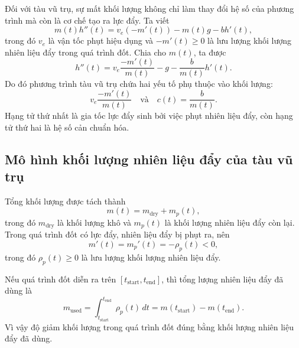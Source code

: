 ﻿\documentclass[12pt]{article}
\begin{document}
Đối với tàu vũ trụ, sự mất khối lượng không chỉ làm thay đổi hệ số của phương trình mà còn là cơ chế tạo ra lực đẩy. Ta viết
\[
 m(t)h''(t) = v_e(-m'(t)) - m(t)g - bh'(t),
\]
trong đó $v_e$ là vận tốc phụt hiệu dụng và $-m'(t)\ge0$ là lưu lượng khối lượng nhiên liệu đẩy trong quá trình đốt. Chia cho $m(t)$, ta được
\[
 h''(t)
 =
 v_e\frac{-m'(t)}{m(t)}
 -g
 -\frac{b}{m(t)}h'(t).
\]
Do đó phương trình tàu vũ trụ chứa hai yếu tố phụ thuộc vào khối lượng:
\[
 v_e\frac{-m'(t)}{m(t)}
 \quad\text{và}\quad
 c(t) = \frac{b}{m(t)}.
\]
Hạng tử thứ nhất là gia tốc lực đẩy sinh bởi việc phụt nhiên liệu đẩy, còn hạng tử thứ hai là hệ số cản chuẩn hóa.

\subsection{Mô hình khối lượng nhiên liệu đẩy của tàu vũ trụ}
Tổng khối lượng được tách thành
\[
 m(t) = m_{\mathrm{dry}} + m_p(t),
\]
trong đó $m_{\mathrm{dry}}$ là khối lượng khô và $m_p(t)$ là khối lượng nhiên liệu đẩy còn lại.
Trong quá trình đốt có lực đẩy, nhiên liệu đẩy bị phụt ra, nên
\[
 m'(t) = m_p'(t) = -\rho_p(t) < 0,
\]
trong đó $\rho_p(t)\ge0$ là lưu lượng khối lượng nhiên liệu đẩy.

Nếu quá trình đốt diễn ra trên $[t_{\mathrm{start}}, t_{\mathrm{end}}]$, thì tổng lượng nhiên liệu đẩy đã dùng là
\[
 m_{\mathrm{used}}
 = \int_{t_{\mathrm{start}}}^{t_{\mathrm{end}}}\rho_p(t)\, dt
 =
 m(t_{\mathrm{start}}) - m(t_{\mathrm{end}}).
\]
Vì vậy độ giảm khối lượng trong quá trình đốt đúng bằng khối lượng nhiên liệu đẩy đã dùng.
\end{document}
